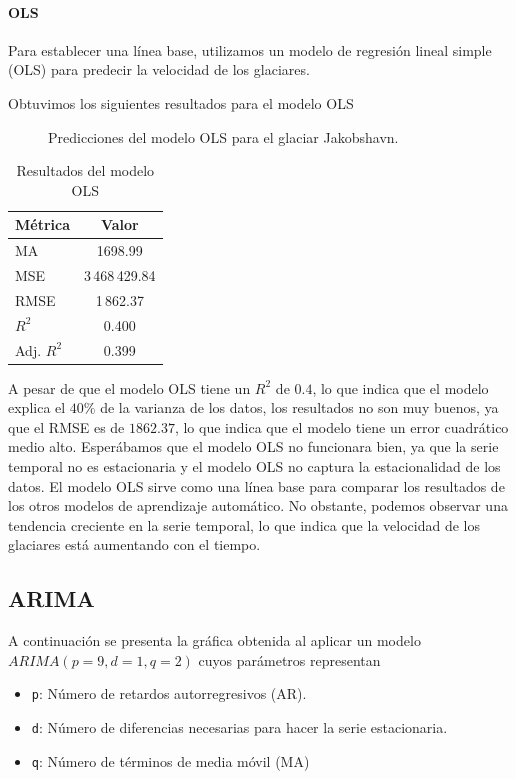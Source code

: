 \documentclass[sigconf,authordraft,language=spanish]{acmart}
\begin{document}
\paragraph{OLS}

Para establecer una línea base, utilizamos un modelo de regresión lineal simple (OLS) para predecir la velocidad de los glaciares.

Obtuvimos los siguientes resultados para el modelo OLS

\begin{figure}[htbp]
   \centering
   
    \caption{Predicciones del modelo OLS para el glaciar Jakobshavn.}
    \label{fig:jakobshavn_ols}
\end{figure}
 

\begin{table}[H]
  \caption{Resultados del modelo OLS}
  \label{tab:ols}
  \begin{tabular}{lc}
    \toprule
    Métrica & Valor \\
    \midrule
    MA & 1698.99 \\
    MSE & 3\,468\,429.84 \\
    RMSE & 1\,862.37 \\
    $R^2$ & 0.400 \\
    Adj. $R^2$ & 0.399 \\
    \bottomrule
  \end{tabular}
\end{table}

A pesar de que el modelo OLS tiene un $R^2$ de $0.4$, lo que indica que el modelo explica el $40\%$ de la varianza de los datos,
los resultados no son muy buenos, ya que el RMSE es de $1862.37$, lo que indica que el modelo tiene un error cuadrático medio alto.
Esperábamos que el modelo OLS no funcionara bien, ya que la serie temporal no es estacionaria y el modelo OLS no captura la estacionalidad de los datos.
El modelo OLS sirve como una línea base para comparar los resultados de los otros modelos de aprendizaje automático.
No obstante, podemos observar una tendencia creciente en la serie temporal, lo que indica que la velocidad de los glaciares está aumentando con el tiempo.

\subsection{ARIMA}

A continuación se presenta la gráfica obtenida al aplicar un modelo $ARIMA(p=9,d=1,q=2)$ cuyos parámetros representan
\begin{itemize}
  \item \verb|p|: Número de retardos autorregresivos (AR).
  \item \verb|d|: Número de diferencias necesarias para hacer la serie estacionaria.
  \item \verb|q|: Número de términos de media móvil (MA)
\end{itemize}
\end{document}
